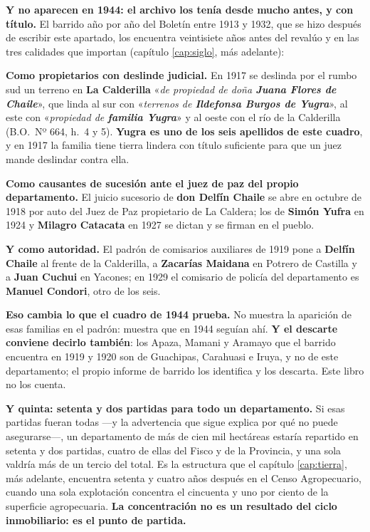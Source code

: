 \begin{cautela}
\textbf{Y no aparecen en 1944: el archivo los tenía desde mucho antes, y con título.} El barrido
año por año del Boletín entre 1913 y 1932, que se hizo después de escribir este apartado, los
encuentra veintisiete años antes del revalúo y en las tres calidades que importan (capítulo
\ref{cap:siglo}, más adelante):

\textbf{Como propietarios con deslinde judicial.} En 1917 se deslinda por el rumbo sud un terreno
en \textbf{La Calderilla} «\textit{de propiedad de doña \textbf{Juana Flores de Chaile}}», que
linda al sur con «\textit{terrenos de \textbf{Ildefonsa Burgos de Yugra}}», al este con
«\textit{propiedad de \textbf{familia Yugra}}» y al oeste con el río de la Calderilla (B.O.\ Nº
664, h.\ 4 y 5). \textbf{Yugra es uno de los seis apellidos de este cuadro}, y en 1917 la familia tiene tierra
lindera con título suficiente para que un juez mande deslindar contra ella.

\textbf{Como causantes de sucesión ante el juez de paz del propio departamento.} El juicio
sucesorio de \textbf{don Delfín Chaile} se abre en octubre de 1918 por auto del Juez de Paz
propietario de La Caldera; los de \textbf{Simón Yufra} en 1924 y \textbf{Milagro Catacata} en 1927
se dictan y se firman en el pueblo.

\textbf{Y como autoridad.} El padrón de comisarios auxiliares de 1919 pone a \textbf{Delfín
Chaile} al frente de la Calderilla, a \textbf{Zacarías Maidana} en Potrero de Castilla y a
\textbf{Juan Cuchui} en Yacones; en 1929 el comisario de policía del departamento es
\textbf{Manuel Condori}, otro de los seis.

\textbf{Eso cambia lo que el cuadro de 1944 prueba.} No muestra la aparición de esas familias en
el padrón: muestra que en 1944 seguían ahí. \textbf{Y el descarte conviene decirlo también}: los
Apaza, Mamani y Aramayo que el barrido encuentra en 1919 y 1920 son de Guachipas, Carahuasi e
Iruya, y no de este departamento; el propio informe de barrido los identifica y los descarta.
Este libro no los cuenta.
\end{cautela}

\textbf{Y quinta: setenta y dos partidas para todo un departamento.} Si esas partidas fueran todas ---y la advertencia que sigue explica por qué no puede asegurarse---, un departamento de más de cien mil hectáreas estaría repartido en setenta y dos partidas, cuatro de ellas del Fisco y de la Provincia, y una sola valdría más de un tercio del total. Es la
estructura que el capítulo \ref{cap:tierra}, más adelante, encuentra setenta y cuatro años después en el Censo Agropecuario, cuando
una sola explotación concentra el cincuenta y uno por ciento de la superficie agropecuaria.
\textbf{La concentración no es un resultado del ciclo inmobiliario: es el punto de partida.}

